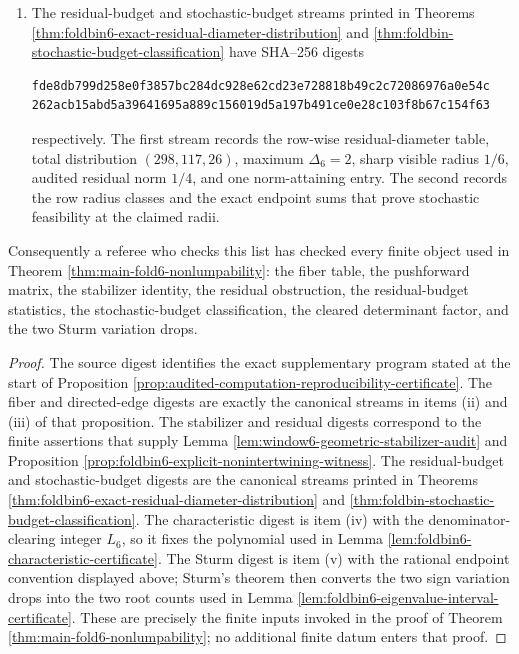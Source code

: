 \begin{proposition}
\begin{enumerate}[label=\textup{(\alph*)}]
\begin{center}
\begin{minipage}{0.92\linewidth}
\end{minipage}
\end{center}
\item The residual-budget and stochastic-budget streams printed in Theorems \ref{thm:foldbin6-exact-residual-diameter-distribution} and \ref{thm:foldbin-stochastic-budget-classification} have SHA--256 digests
\begin{center}
\begin{minipage}{0.92\linewidth}
\begin{Verbatim}[breaklines=true,breakanywhere=true,fontsize=\scriptsize]
fde8db799d258e0f3857bc284dc928e62cd23e728818b49c2c72086976a0e54c
262acb15abd5a39641695a889c156019d5a197b491ce0e28c103f8b67c154f63
\end{Verbatim}
\end{minipage}
\end{center}
respectively.  The first stream records the row-wise residual-diameter table, total distribution \((298,117,26)\), maximum \(\Delta_6=2\), sharp visible radius \(1/6\), audited residual norm \(1/4\), and one norm-attaining entry.  The second records the row radius classes and the exact endpoint sums that prove stochastic feasibility at the claimed radii.
\end{enumerate}
Consequently a referee who checks this list has checked every finite object used in Theorem \ref{thm:main-fold6-nonlumpability}: the fiber table, the pushforward matrix, the stabilizer identity, the residual obstruction, the residual-budget statistics, the stochastic-budget classification, the cleared determinant factor, and the two Sturm variation drops.
\end{proposition}

\begin{proof}
The source digest identifies the exact supplementary program stated at the start of Proposition \ref{prop:audited-computation-reproducibility-certificate}.  The fiber and directed-edge digests are exactly the canonical streams in items \textup{(ii)} and \textup{(iii)} of that proposition.  The stabilizer and residual digests correspond to the finite assertions that supply Lemma \ref{lem:window6-geometric-stabilizer-audit} and Proposition \ref{prop:foldbin6-explicit-nonintertwining-witness}.  The residual-budget and stochastic-budget digests are the canonical streams printed in Theorems \ref{thm:foldbin6-exact-residual-diameter-distribution} and \ref{thm:foldbin-stochastic-budget-classification}.  The characteristic digest is item \textup{(iv)} with the denominator-clearing integer \(L_6\), so it fixes the polynomial used in Lemma \ref{lem:foldbin6-characteristic-certificate}.  The Sturm digest is item \textup{(v)} with the rational endpoint convention displayed above; Sturm's theorem then converts the two sign variation drops into the two root counts used in Lemma \ref{lem:foldbin6-eigenvalue-interval-certificate}.  These are precisely the finite inputs invoked in the proof of Theorem \ref{thm:main-fold6-nonlumpability}; no additional finite datum enters that proof. \qedhere
\end{proof}

